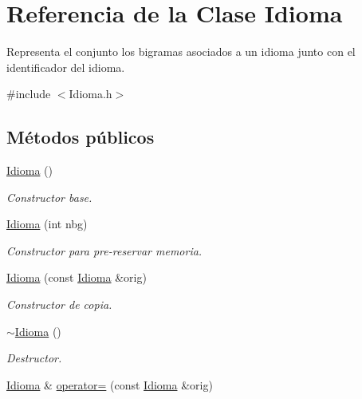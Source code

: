 \hypertarget{classIdioma}{}\section{Referencia de la Clase Idioma}
\label{classIdioma}


Representa el conjunto los bigramas asociados a un idioma junto con el identificador del idioma.  




{\ttfamily \#include $<$Idioma.\+h$>$}

\subsection*{Métodos públicos}
\begin{DoxyCompactItemize}
\item 
\mbox{\label{classIdioma_a6722a621ce03825772493e67e5a17215}} 
\hyperlink{classIdioma_a6722a621ce03825772493e67e5a17215}{Idioma} ()
\begin{DoxyCompactList}\small\item\em Constructor base. \end{DoxyCompactList}\item 
\hyperlink{classIdioma_aa6efbcb93b1c9138c22f5754da90d3c0}{Idioma} (int nbg)
\begin{DoxyCompactList}\small\item\em Constructor para pre-\/reservar memoria. \end{DoxyCompactList}\item 
\hyperlink{classIdioma_acddd7589175d95fc58101ca4fdbf3679}{Idioma} (const \hyperlink{classIdioma}{Idioma} \&orig)
\begin{DoxyCompactList}\small\item\em Constructor de copia. \end{DoxyCompactList}\item 
\mbox{\label{classIdioma_a80c90f8c9a7f824d7d7d171b9face201}} 
\hyperlink{classIdioma_a80c90f8c9a7f824d7d7d171b9face201}{$\sim$\+Idioma} ()
\begin{DoxyCompactList}\small\item\em Destructor. \end{DoxyCompactList}\item 
\hyperlink{classIdioma}{Idioma} \& \hyperlink{classIdioma_a0d073160913271ba93aa8c560a16d1c5}{operator=} (const \hyperlink{classIdioma}{Idioma} \&orig)

\end{DoxyCompactItemize}
